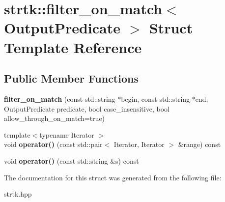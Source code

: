 \hypertarget{structstrtk_1_1filter__on__match}{\section{strtk\-:\-:filter\-\_\-on\-\_\-match$<$ Output\-Predicate $>$ Struct Template Reference}
\label{structstrtk_1_1filter__on__match}
}
\subsection*{Public Member Functions}
\begin{DoxyCompactItemize}
\item 
\hypertarget{structstrtk_1_1filter__on__match_ac2bc7ea1b5054a5db44ccb3878958475}{{\bfseries filter\-\_\-on\-\_\-match} (const std\-::string $\ast$begin, const std\-::string $\ast$end, Output\-Predicate predicate, bool case\-\_\-insensitive, bool allow\-\_\-through\-\_\-on\-\_\-match=true)}\label{structstrtk_1_1filter__on__match_ac2bc7ea1b5054a5db44ccb3878958475}

\item 
\hypertarget{structstrtk_1_1filter__on__match_aa0175e5f6a4080e4fefc669e3700f972}{{\footnotesize template$<$typename Iterator $>$ }\\void {\bfseries operator()} (const std\-::pair$<$ Iterator, Iterator $>$ \&range) const }\label{structstrtk_1_1filter__on__match_aa0175e5f6a4080e4fefc669e3700f972}

\item 
\hypertarget{structstrtk_1_1filter__on__match_a5a45989738a76604b3edc0fddf95e899}{void {\bfseries operator()} (const std\-::string \&s) const }\label{structstrtk_1_1filter__on__match_a5a45989738a76604b3edc0fddf95e899}

\end{DoxyCompactItemize}


The documentation for this struct was generated from the following file\-:\begin{DoxyCompactItemize}
\item 
strtk.\-hpp\end{DoxyCompactItemize}
